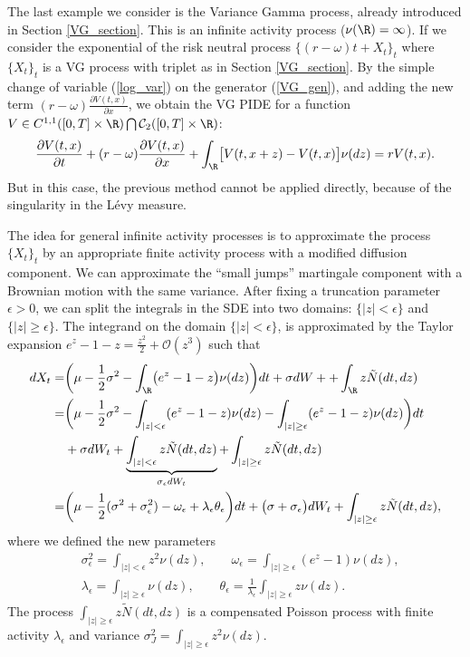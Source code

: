 The last example we consider is the Variance Gamma process, already introduced in Section \ref{VG_section}. This is an infinite activity process
($\nu(\R) = \infty$). 
If we consider the exponential of the risk neutral process $\{ (r-\omega)t + X_t\}_t$ where $\{X_t\}_t$ is a VG process with triplet as in Section \ref{VG_section}.
By the simple change of variable (\ref{log_var}) on the generator (\ref{VG_gen}), and adding the new term 
$(r-\omega) \frac{\partial V(t,x)}{\partial x}$, we obtain the VG PIDE for a function $V \in C^{1,1}([0,T] \times \R) \bigcap \mathcal{C}_2([0,T] \times \R)$:
\begin{equation} \label{VG_PIDE}
 \frac{\partial V(t,x)}{\partial t} + (r-\omega) \frac{\partial V(t,x)}{\partial x}
 + \int_{\R} \bigl[ V(t,x+z) - V(t,x) \bigr] \nu(dz) = rV(t,x) .
\end{equation}
But in this case, the previous method cannot be applied directly, because of the singularity in the Lévy measure.

The idea for general infinite activity processes is to approximate the process $\{X_t\}_t$ by an
appropriate finite activity process with a modified diffusion component.
We can approximate the ``small jumps'' martingale component with a Brownian motion with the same variance.
After fixing a truncation parameter $\epsilon >0$, we can split the integrals in the SDE into two domains: $\{|z|<\epsilon\}$ and $\{|z|\geq \epsilon\}$.
The integrand on the domain $\{ |z|<\epsilon \}$, is approximated by the Taylor expansion 
 $e^z-1-z = \frac{z^2}{2} + \mathcal{O}(z^3)$ such that
\begin{align}\label{log_sde_inf_act}\nonumber
  dX_t =& \biggl( \mu-\frac{1}{2}\sigma^2 - \int_{\R} \bigl( e^z-1-z \bigr) \nu(dz) \biggr)dt + \sigma dW + + \int_{\R} z \tilde N(dt,dz) \\ \nonumber
       =& \biggl( \mu - \frac{1}{2}\sigma^2 -\int_{|z|<\epsilon} (e^z-1-z) \nu(dz) -\int_{|z|\geq \epsilon} (e^z-1-z) \nu(dz)  \biggr) dt\\ \nonumber
        &+ \sigma dW_t + \underbrace{\int_{|z|< \epsilon} z \tilde N(dt,dz)}_{\sigma_{\epsilon} dW_t} + \int_{|z| \geq \epsilon} z \tilde N(dt,dz) \\ 
       =& \biggl( \mu - \frac{1}{2} (\sigma^2 + \sigma_{\epsilon}^2) - \omega_{\epsilon} + \lambda_{\epsilon} \theta_{\epsilon}  \biggr) dt + \bigl( \sigma+\sigma_{\epsilon}\bigr) dW_t 
       + \int_{|z|\geq \epsilon} z \tilde N(dt,dz) ,
\end{align}
where we defined the new parameters
\begin{align}\label{sig_eps}
 & \sigma_{\epsilon}^2 =  \int_{|z| < \epsilon} z^2 \nu(dz), \quad \quad \omega_{\epsilon} = \int_{|z| \geq \epsilon} (e^z-1) \nu(dz), \\ \nonumber
 & \lambda_{\epsilon} =  \int_{|z| \geq \epsilon} \nu(dz), \quad \quad \theta_{\epsilon} = \frac{1}{\lambda_{\epsilon}} \int_{|z| \geq \epsilon} z \nu(dz) .
\end{align}
The process $\int_{|z|\geq \epsilon} z \tilde N(dt,dz)$ is a compensated Poisson process with finite activity $\lambda_{\epsilon}$ 
and variance $\sigma_J^2 = \int_{|z| \geq \epsilon} z^2 \nu(dz) $.

